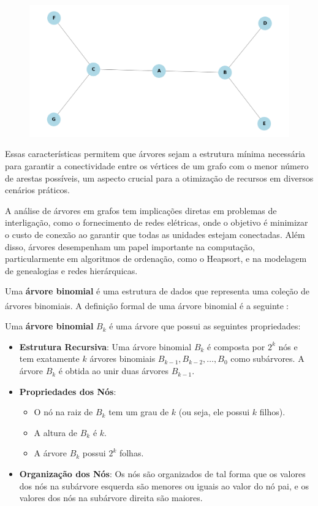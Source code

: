 \documentclass[12pt, a4paper]{scrreprt}
\begin{document}
\begin{figure}[h]
    \centering
    \includegraphics[width=.65\textwidth]{src/arvore_exemplo.png}
    \label{fig:exemplo de árvore}
\end{figure}

Essas características permitem que árvores sejam a estrutura mínima necessária para garantir a conectividade entre os vértices de um grafo com o menor número de arestas possíveis, um aspecto crucial para a otimização de recursos em diversos cenários práticos.

A análise de árvores em grafos tem implicações diretas em problemas de interligação, como o fornecimento de redes elétricas, onde o objetivo é minimizar o custo de conexão ao garantir que todas as unidades estejam conectadas. Além disso, árvores desempenham um papel importante na computação, particularmente em algoritmos de ordenação, como o Heapsort, e na modelagem de genealogias e redes hierárquicas.

Uma \textbf{árvore binomial} é uma estrutura de dados que representa uma coleção de árvores binomiais. A definição formal de uma árvore binomial é a seguinte\textsuperscript{\cite{definicaoarvorebinomialEllis} \cite{definicaoarvorebinomialTarjan}}:

Uma \textbf{árvore binomial} \( B_k \) é uma árvore que possui as seguintes propriedades:

\begin{itemize}
    \item \textbf{Estrutura Recursiva}: Uma árvore binomial \( B_k \) é composta por \( 2^k \) nós e tem exatamente \( k \) árvores binomiais \( B_{k-1}, B_{k-2}, \ldots, B_0 \) como subárvores. A árvore \( B_k \) é obtida ao unir duas árvores \( B_{k-1} \).
    
    \item \textbf{Propriedades dos Nós}: 
    \begin{itemize}
        \item O nó na raiz de \( B_k \) tem um grau de \( k \) (ou seja, ele possui \( k \) filhos).
        \item A altura de \( B_k \) é \( k \).
        \item A árvore \( B_k \) possui \( 2^k \) folhas.
    \end{itemize}
    
    \item \textbf{Organização dos Nós}: Os nós são organizados de tal forma que os valores dos nós na subárvore esquerda são menores ou iguais ao valor do nó pai, e os valores dos nós na subárvore direita são maiores.
\end{itemize}
\end{document}
